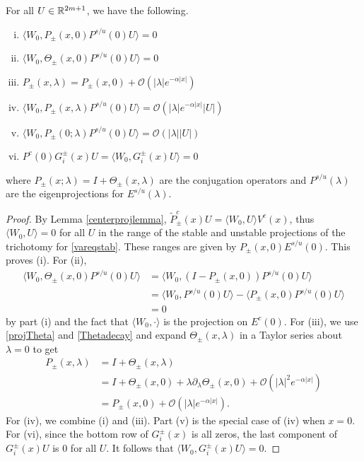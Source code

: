\documentclass[thesis.tex]{subfiles}
\begin{document}
\begin{lemma}\label{W0projlemma}
For all $U \in \mathbb{R}^{2m+1}$, we have the following.
\begin{enumerate}[(i)]
	\item $\langle W_0, P_\pm(x, 0) P^{s/u}(0) U \rangle = 0$
	\item $\langle W_0, \Theta_\pm(x, 0) P^{s/u}(0) U \rangle = 0$
	\item $P_\pm(x, \lambda) = P_\pm(x, 0) + \mathcal{O}(|\lambda|e^{-\alpha|x|})$
	\item $\langle W_0, P_\pm(x, \lambda) P^{s/u}(0) U \rangle = \mathcal{O}(|\lambda|e^{-\alpha|x|}|U|)$
	\item $\langle W_0, P_\pm(0; \lambda) P^{s/u}(0) U \rangle = \mathcal{O}(|\lambda||U|)$
	\item $P^c(0) G_i^\pm(x) U = \langle W_0, G_i^\pm(x) U\rangle = 0$
\end{enumerate}
where $P_\pm(x; \lambda) = I + \Theta_\pm(x, \lambda)$ are the conjugation operators and $P^{s/u}(\lambda)$ are the eigenprojections for $E^{s/u}(\lambda)$.
\begin{proof}
By Lemma \ref{centerprojlemma}, $\tilde{P}_\pm^c(x)U = \langle W_0, U \rangle V^c(x)$, thus $\langle W_0, U \rangle = 0$ for all $U$ in the range of the stable and unstable projections of the trichotomy for \cref{vareqstab}. These ranges are given by $P_\pm(x, 0) E^{s/u}(0)$. This proves (i). For (ii), 
\begin{align*}
\langle W_0, \Theta_\pm(x, 0) P^{s/u}(0) U\rangle &=
\langle W_0, (I - P_\pm(x, 0)) P^{s/u}(0) U\rangle \\
&= \langle W_0, P^{s/u}(0) U \rangle - \langle P_\pm(x, 0)P^{s/u}(0) U \rangle \\
&= 0
\end{align*}
by part (i) and the fact that $\langle W_0, \cdot \rangle$ is the projection on $E^c(0)$. For (iii), we use \cref{projTheta} and \cref{Thetadecay} and expand $\Theta_\pm(x, \lambda)$ in a Taylor series about $\lambda = 0$ to get
\begin{align*}
P_\pm(x, \lambda) &= I + \Theta_\pm(x, \lambda) \\
&= I + \Theta_\pm(x, 0) + \lambda \partial_\lambda \Theta_\pm(x, 0) + \mathcal{O}(|\lambda|^2 e^{-\alpha |x|} ) \\
&= P_\pm(x, 0) + \mathcal{O}(|\lambda|e^{-\alpha|x|}).
\end{align*}
For (iv), we combine (i) and (iii). Part (v) is the special case of (iv) when $x = 0$. For (vi), since the bottom row of $G_i^\pm(x)$ is all zeros, the last component of $G_i^\pm(x) U$ is 0 for all $U$. It follows that $\langle W_0, G_i^\pm(x) U\rangle = 0$. 
\end{proof}
\end{lemma}
\end{document}
